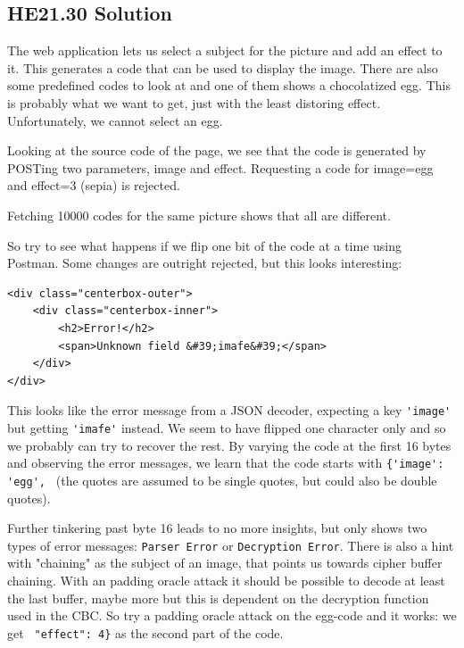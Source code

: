 \documentclass[english,a4paper,nols,noindent]{tufte-handout}
\begin{document}
\hypertarget{he21.30-solution}{%
\subsection{HE21.30 Solution}\label{he21.30-solution}}

\noindent The web application lets us select a subject for the picture and add
an effect to it.  This generates a code that can be used to display the image.
There are also some predefined codes to look at and one of them shows a
chocolatized egg.  This is probably what we want to get, just with the least
distoring effect.  Unfortunately, we cannot select an egg.

Looking at the source code of the page, we see that the code is generated by
POSTing two parameters, image and effect.  Requesting a code for image=egg and
effect=3 (sepia) is rejected.

Fetching 10000 codes for the same picture shows that all are different.

So try to see what happens if we flip one bit of the code at a time using
Postman.  Some changes are outright rejected, but this looks interesting:

\begin{verbatim}
<div class="centerbox-outer">
    <div class="centerbox-inner">
        <h2>Error!</h2>
        <span>Unknown field &#39;imafe&#39;</span>
    </div>
</div>
\end{verbatim}

This looks like the error message from a JSON decoder, expecting a key
\verb+'image'+ but getting \verb+'imafe'+ instead.  We seem to have flipped one
character only and so we probably can try to recover the rest.  By varying the
code at the first 16 bytes and observing the error messages, we learn that the
code starts with \verb+{'image': 'egg', + (the quotes are assumed to be single
quotes, but could also be double quotes).

Further tinkering past byte 16 leads to no more insights, but only shows two types of error
messages: \verb+Parser Error+ or \verb+Decryption Error+.  There is also a hint
with "chaining" as the subject of an image, that points us towards cipher
buffer chaining.  With an padding oracle attack it should be possible to decode
at least the last buffer, maybe more but this is dependent on the decryption
function used in the CBC.  So try a padding oracle attack on the egg-code and
it works:  we get \verb+ "effect": 4}+ as the second part of the code.
\end{document}
